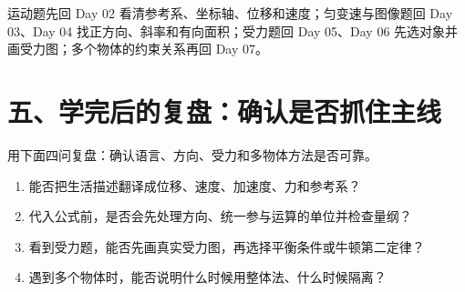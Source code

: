 运动题先回 Day 02 看清参考系、坐标轴、位移和速度；匀变速与图像题回 Day 03、Day 04 找正方向、斜率和有向面积；受力题回 Day 05、Day 06 先选对象并画受力图；多个物体的约束关系再回 Day 07。

\section*{五、学完后的复盘：确认是否抓住主线}

用下面四问复盘：确认语言、方向、受力和多物体方法是否可靠。
\begin{enumerate}[itemsep=0.05em, topsep=0.1em]
  \item 能否把生活描述翻译成位移、速度、加速度、力和参考系？
  \item 代入公式前，是否会先处理方向、统一参与运算的单位并检查量纲？
  \item 看到受力题，能否先画真实受力图，再选择平衡条件或牛顿第二定律？
  \item 遇到多个物体时，能否说明什么时候用整体法、什么时候隔离？
\end{enumerate}
